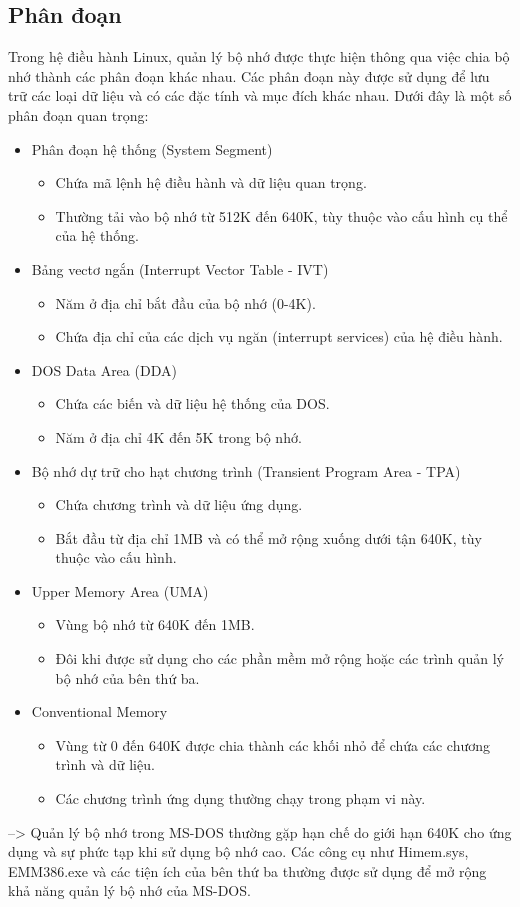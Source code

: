 \documentclass[12pt,a4paper]{article}
\begin{document}
\subsection{Phân đoạn}
Trong hệ điều hành Linux, quản lý bộ nhớ được thực hiện thông qua việc chia bộ nhớ thành các phân đoạn khác nhau. Các phân đoạn này được sử dụng để lưu trữ các loại dữ liệu và có các đặc tính và mục đích khác nhau. Dưới đây là một số phân đoạn quan trọng:
\begin{itemize}
	\item Phân đoạn hệ thống (System Segment)
	\begin{itemize}
		\item Chứa mã lệnh hệ điều hành và dữ liệu quan trọng.
		\item Thường tải vào bộ nhớ từ 512K đến 640K, tùy thuộc vào cấu hình cụ thể của hệ thống.
	\end{itemize}
	\item Bảng vectơ ngắn (Interrupt Vector Table - IVT)
	\begin{itemize}
		\item Năm ở địa chỉ bắt đầu của bộ nhớ (0-4K).
		\item Chứa địa chỉ của các dịch vụ ngăn (interrupt services) của hệ điều hành.
	\end{itemize}
	\item DOS Data Area (DDA)
	\begin{itemize}
		\item Chứa các biến và dữ liệu hệ thống của DOS.
		\item Năm ở địa chỉ 4K đến 5K trong bộ nhớ.
	\end{itemize}
	\item Bộ nhớ dự trữ cho hạt chương trình (Transient Program Area - TPA)
	\begin{itemize}
		\item Chứa chương trình và dữ liệu ứng dụng.
		\item Bắt đầu từ địa chỉ 1MB và có thể mở rộng xuống dưới tận 640K, tùy thuộc vào cấu hình.
	\end{itemize}
	\item Upper Memory Area (UMA)
	\begin{itemize}
		\item Vùng bộ nhớ từ 640K đến 1MB.
		\item Đôi khi được sử dụng cho các phần mềm mở rộng hoặc các trình quản lý bộ nhớ của bên thứ ba.
	\end{itemize}
	\item Conventional Memory
	\begin{itemize}
		\item Vùng từ 0 đến 640K được chia thành các khối nhỏ để chứa các chương trình và dữ liệu.
		\item Các chương trình ứng dụng thường chạy trong phạm vi này.
	\end{itemize}
\end{itemize}
--> Quản lý bộ nhớ trong MS-DOS thường gặp hạn chế do giới hạn 640K cho ứng dụng và sự phức tạp khi sử dụng bộ nhớ cao. Các công cụ như Himem.sys, EMM386.exe và các tiện ích của bên thứ ba thường được sử dụng để mở rộng khả năng quản lý bộ nhớ của MS-DOS.
\end{document}
